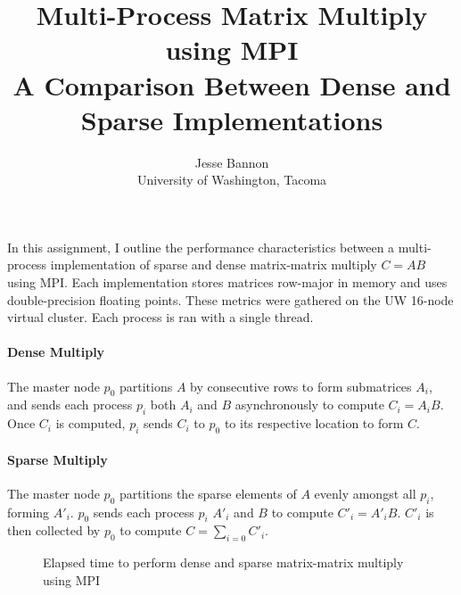 \documentclass{article}
\begin{document}
\title{Multi-Process Matrix Multiply using MPI \\ \large A Comparison Between Dense and Sparse Implementations}
\author{Jesse Bannon\\
University of Washington, Tacoma}
\renewcommand{\today}{July 19, 2017}
\maketitle

In this assignment, I outline the performance characteristics between a multi-process implementation of sparse and dense matrix-matrix multiply $C = AB$ using MPI. Each implementation stores matrices row-major in memory and uses double-precision floating points. These metrics were gathered on the UW 16-node virtual cluster.  Each process is ran with a single thread.

\paragraph{Dense Multiply}
The master node $p_{0}$ partitions $A$ by consecutive rows to form submatrices $A_{i}$, and sends each process $p_{i}$ both $A_{i}$ and $B$ asynchronously to compute $C_{i} = A_{i}B$. Once $C_{i}$ is computed, $p_{i}$ sends $C_{i}$ to $p_{0}$ to its respective location to form $C$.

\paragraph{Sparse Multiply}
The master node $p_{0}$ partitions the sparse elements of $A$ evenly amongst all $p_{i}$, forming $A'_{i}$. $p_0$ sends each process $p_i$ $A'_{i}$ and $B$ to compute $C'_i = A'_{i}B$. $C'_i$ is then collected by $p_{0}$ to compute $C = \sum_{i=0} C'_i$.

\begin{figure}[h]      
	\centering 
    \hspace{10px}
    \hspace{10px}
    \caption{Elapsed time to perform dense and sparse matrix-matrix multiply using MPI}
    \label{materialflowChart}
\end{figure}
\end{document}
